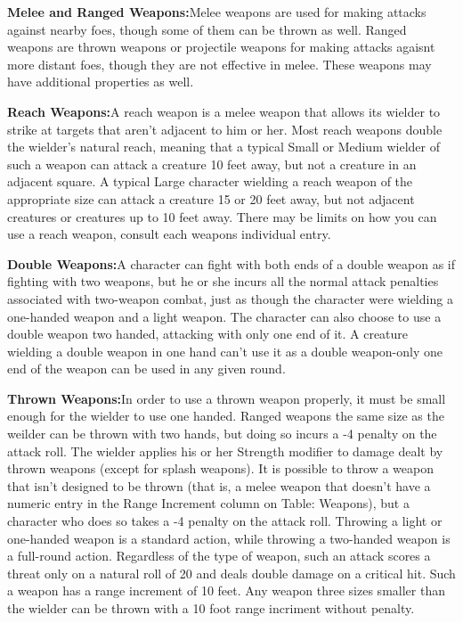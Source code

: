 {\noindent\textbf{Melee and Ranged Weapons:}{Melee weapons are used for making attacks against nearby foes, though some of them can be thrown as well. Ranged weapons are thrown weapons or projectile weapons for making attacks agaisnt more distant foes, though they are not effective in melee. These weapons may have additional properties as well.}

\noindent\textbf{Reach Weapons:}{A reach weapon is a melee weapon that allows its wielder to strike at targets that aren't adjacent to him or her. Most reach weapons double the wielder's natural reach, meaning that a typical Small or Medium wielder of such a weapon can attack a creature 10 feet away, but not a creature in an adjacent square. A typical Large character wielding a reach weapon of the appropriate size can attack a creature 15 or 20 feet away, but not adjacent creatures or creatures up to 10 feet away. There may be limits on how you can use a reach weapon, consult each weapons individual entry.}

\noindent\textbf{Double Weapons:}{A character can fight with both ends of a double weapon as if fighting with two weapons, but he or she incurs all the normal attack penalties associated with two-weapon combat, just as though the character were wielding a one-handed weapon and a light weapon. The character can also choose to use a double weapon two handed, attacking with only one end of it. A creature wielding a double weapon in one hand can't use it as a double weapon-only one end of the weapon can be used in any given round.}

\noindent\textbf{Thrown Weapons:}{In order to use a thrown weapon properly, it must be small enough for the wielder to use one handed. Ranged weapons the same size as the weilder can be thrown with two hands, but doing so incurs a -4 penalty on the attack roll. The wielder applies his or her Strength modifier to damage dealt by thrown weapons (except for splash weapons). It is possible to throw a weapon that isn't designed to be thrown (that is, a melee weapon that doesn't have a numeric entry in the Range Increment column on Table: Weapons), but a character who does so takes a -4 penalty on the attack roll. Throwing a light or one-handed weapon is a standard action, while throwing a two-handed weapon is a full-round action. Regardless of the type of weapon, such an attack scores a threat only on a natural roll of 20 and deals double damage on a critical hit. Such a weapon has a range increment of 10 feet. Any weapon three sizes smaller than the wielder can be thrown with a 10 foot range incriment without penalty.}

}
